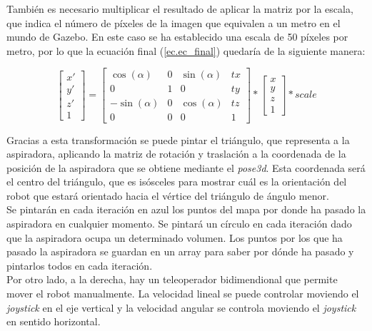 También es necesario multiplicar el resultado de aplicar la matriz por la escala, que indica el número de píxeles de la imagen que equivalen a un metro en el mundo de Gazebo. En este caso se ha establecido una escala de 50 píxeles por metro, por lo que la ecuación final (\ref{ec.ec_final}) quedaría de la siguiente manera:

\begin{equation}
\label{ec.ec_final}
\left[\begin{array}{cc}
x' \\ 
y' \\
z' \\
1
\end{array}\right] = \left[\begin{array}{cccc}
\cos(\alpha) & 0 & \sin(\alpha) & tx \\ 
0 & 1 & 0 & ty\\
-\sin(\alpha) & 0 & \cos(\alpha) & tz \\
0 & 0 & 0 & 1
\end{array}\right]* \left[\begin{array}{cc}
x \\ 
y \\
z \\
1
\end{array}\right]*scale
\end{equation}


Gracias a esta transformación se puede pintar el triángulo, que representa a la aspiradora, aplicando la matriz de rotación y traslación a la coordenada de la posición de la aspiradora que se obtiene mediante el \textit{pose3d}. Esta coordenada será el centro del triángulo, que es isósceles para mostrar cuál es la orientación del robot que estará orientado hacia el vértice del triángulo de ángulo menor.\\

Se pintarán en cada iteración en azul los puntos del mapa por donde ha pasado la aspiradora en cualquier momento. Se pintará un círculo en cada iteración dado que la aspiradora ocupa un determinado volumen. Los puntos por los que ha pasado la aspiradora se guardan en un array para saber por dónde ha pasado y pintarlos todos en cada iteración.\\

Por otro lado, a la derecha, hay un teleoperador bidimendional que permite mover el robot manualmente. La velocidad lineal se puede controlar moviendo el \textit{joystick} en el eje vertical y la velocidad angular se controla moviendo el \textit{joystick} en sentido horizontal.\\

